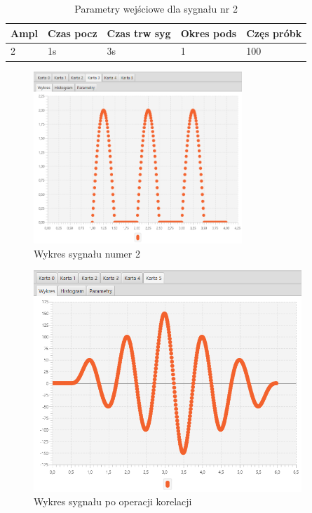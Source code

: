 \documentclass[12pt]{article}
\begin{document}
{{{                \begin{table}[H]
                    \centering
                    \begin{tabular}{|l|l|l|l|l|}
                        \hline
                        Ampl & Czas pocz & Czas trw syg & Okres pods & Częs próbk   \\ \hline
                        2 & 1s & 3s & 1 & 100           \\ \hline
                    \end{tabular}
                    \caption{Parametry wejściowe dla sygnału nr 2}
                \end{table}
                \begin{figure}[H]
                    \centering
                    \includegraphics[width=0.7\textwidth]{img/result/correlation/experiment2/data_122752.png}
                    \caption{Wykres sygnału numer 2}
                \end{figure}

                \begin{figure}[H]
                    \centering
                    \includegraphics[width=0.9\textwidth]{img/result/correlation/experiment2/data_122807.png}
                    \caption{Wykres sygnału po operacji korelacji}
                \end{figure}
            }
            \newpage

}}
\end{document}
